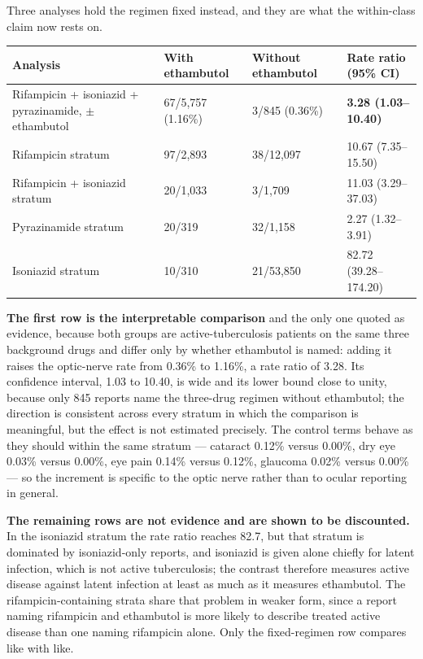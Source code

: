 \documentclass[utf8]{FrontiersinVancouver}
\begin{document}
Three analyses hold the regimen fixed instead, and they are what the within-class claim now rests on.

\begin{table}[htbp]
\centering
\begin{tabular}{llll}
\hline
Analysis & With ethambutol & Without ethambutol & Rate ratio (95\% CI) \\
\hline
Rifampicin + isoniazid + pyrazinamide, $\pm$ ethambutol & 67/5,757 (1.16\%) & 3/845 (0.36\%) & \textbf{3.28 (1.03--10.40)} \\
Rifampicin stratum & 97/2,893 & 38/12,097 & 10.67 (7.35--15.50) \\
Rifampicin + isoniazid stratum & 20/1,033 & 3/1,709 & 11.03 (3.29--37.03) \\
Pyrazinamide stratum & 20/319 & 32/1,158 & 2.27 (1.32--3.91) \\
Isoniazid stratum & 10/310 & 21/53,850 & 82.72 (39.28--174.20) \\
\hline
\end{tabular}
\end{table}

\textbf{The first row is the interpretable comparison} and the only one quoted as evidence, because both groups are active-tuberculosis patients on the same three background drugs and differ only by whether ethambutol is named: adding it raises the optic-nerve rate from 0.36\% to 1.16\%, a rate ratio of 3.28. Its confidence interval, 1.03 to 10.40, is wide and its lower bound close to unity, because only 845 reports name the three-drug regimen without ethambutol; the direction is consistent across every stratum in which the comparison is meaningful, but the effect is not estimated precisely. The control terms behave as they should within the same stratum --- cataract 0.12\% versus 0.00\%, dry eye 0.03\% versus 0.00\%, eye pain 0.14\% versus 0.12\%, glaucoma 0.02\% versus 0.00\% --- so the increment is specific to the optic nerve rather than to ocular reporting in general.

\textbf{The remaining rows are not evidence and are shown to be discounted.} In the isoniazid stratum the rate ratio reaches 82.7, but that stratum is dominated by isoniazid-only reports, and isoniazid is given alone chiefly for latent infection, which is not active tuberculosis; the contrast therefore measures active disease against latent infection at least as much as it measures ethambutol. The rifampicin-containing strata share that problem in weaker form, since a report naming rifampicin and ethambutol is more likely to describe treated active disease than one naming rifampicin alone. Only the fixed-regimen row compares like with like.
\end{document}
